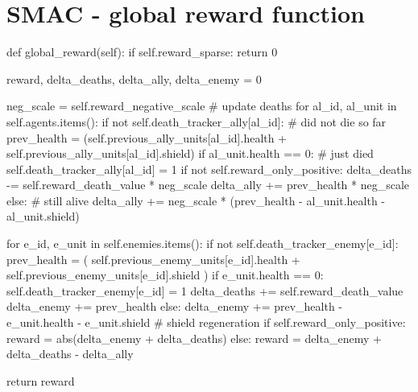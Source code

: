 \section{SMAC - global reward function}
\label{sec:reward_global_python_code}
	\begin{python}
def global_reward(self):
	if self.reward_sparse:
		return 0
	
	reward, delta_deaths, delta_ally, delta_enemy = 0
	
	neg_scale = self.reward_negative_scale
	# update deaths
	for al_id, al_unit in self.agents.items():
		if not self.death_tracker_ally[al_id]:
		# did not die so far
		prev_health = (self.previous_ally_units[al_id].health			+ self.previous_ally_units[al_id].shield)
	if al_unit.health == 0:
		# just died
		self.death_tracker_ally[al_id] = 1
		if not self.reward_only_positive:
			delta_deaths -= self.reward_death_value * neg_scale
			delta_ally += prev_health * neg_scale
		else:
		# still alive
			delta_ally += neg_scale * (prev_health - al_unit.health - al_unit.shield)
	
	for e_id, e_unit in self.enemies.items():
		if not self.death_tracker_enemy[e_id]:
			prev_health = (
			self.previous_enemy_units[e_id].health
			+ self.previous_enemy_units[e_id].shield
			)
		if e_unit.health == 0:
			self.death_tracker_enemy[e_id] = 1
			delta_deaths += self.reward_death_value
			delta_enemy += prev_health
		else:
			delta_enemy += prev_health - e_unit.health - e_unit.shield
	# shield regeneration
	if self.reward_only_positive:
		reward = abs(delta_enemy + delta_deaths)  
	else:
		reward = delta_enemy + delta_deaths - delta_ally

return reward
	\end{python}
\newpage
